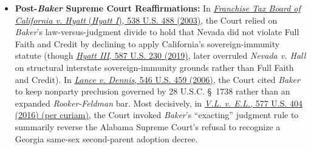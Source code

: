 \documentclass[12pt]{article}
\begin{document}
\begin{itemize}

\item \textbf{Post-\textit{Baker} Supreme Court Reaffirmations:} In \href{https://supreme.justia.com/cases/federal/us/538/488/case.pdf}{\textit{Franchise Tax Board of California v. Hyatt} (\textit{Hyatt I}), 538 U.S. 488 (2003)}, the Court relied on \textit{Baker}'s law-versus-judgment divide to hold that Nevada did not violate Full Faith and Credit by declining to apply California's sovereign-immunity statute (though \href{https://supreme.justia.com/cases/federal/us/587/17-1299/}{\textit{Hyatt III}, 587 U.S. 230 (2019)}, later overruled \textit{Nevada v. Hall} on structural interstate sovereign-immunity grounds rather than Full Faith and Credit). In \href{https://www.law.cornell.edu/supremecourt/text/05-555}{\textit{Lance v. Dennis}, 546 U.S. 459 (2006)}, the Court cited \textit{Baker} to keep nonparty preclusion governed by 28 U.S.C. \S~1738 rather than an expanded \textit{Rooker-Feldman} bar. Most decisively, in \href{https://supreme.justia.com/cases/federal/us/577/404/}{\textit{V.L. v. E.L.}, 577 U.S. 404 (2016) (per curiam)}, the Court invoked \textit{Baker}'s ``exacting'' judgment rule to summarily reverse the Alabama Supreme Court's refusal to recognize a Georgia same-sex second-parent adoption decree.

\end{itemize}
\end{document}
